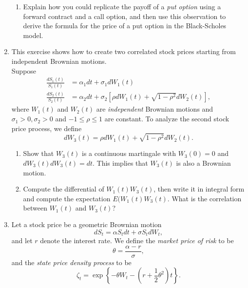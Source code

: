 \documentclass[11pt,a4,table]{article}
\begin{document}
\begin{enumerate}
\begin{enumerate}
        \item Explain how you could replicate the payoff of a \textit{put option} using a forward contract and a call option, and then use this observation to derive the formula for the price of a put option in the Black-Scholes model.
    \end{enumerate}
    
    \item This exercise shows how to create two correlated stock prices starting from independent Brownian motions.\\
    Suppose
    \begin{align}
        \frac{dS_1(t)}{S_1(t)} &= \alpha_1 dt + \sigma_1 dW_1(t)\\
        \frac{dS_2(t)}{S_2(t)} &= \alpha_2 dt + \sigma_2 \left[ \rho dW_1(t) + \sqrt{1-\rho^2} dW_2(t)\right],
    \end{align}
    where $W_1(t)$ and $W_2(t)$ are \textit{independent} Brownian motions and $\sigma_1>0,\sigma_2>0$ and $-1\leq \rho \leq 1$ are constant. To analyze the second stock price process, we define
    \begin{equation*}
        dW_3(t) = \rho dW_1(t) + \sqrt{1-\rho^2} dW_2(t).
    \end{equation*}
    
    \begin{enumerate}
        \item Show that $W_3(t)$ is a continuous martingale with $W_3(0)=0$ and $dW_3(t) dW_3(t) = dt$. This implies that $W_3(t)$ is also a Brownian motion.
        
        \item Compute the differential of $W_1(t) W_3(t)$, then write it in integral form and compute the expectation $E(W_1(t)W_3(t)$. What is the correlation between $W_1(t)$ and $W_3(t)$?
    \end{enumerate}
    
    
    \item Let a stock price be a geometric Brownian motion
    \begin{equation*}
        dS_t= \alpha S_t dt + \sigma S_t dW_t,
    \end{equation*}
    and let $r$ denote the interest rate. We define the \textit{market price of risk} to be
    \begin{equation*}
        \theta = \frac{\alpha -r}{\sigma},
    \end{equation*}
    and the \textit{state price density process} to be
    \begin{equation*}
        \zeta_t = \exp\left\{-\theta W_t -\left(r + \frac{1}{2}\theta^2\right) t\right\}.
    \end{equation*}
    

\end{enumerate}
\end{document}

